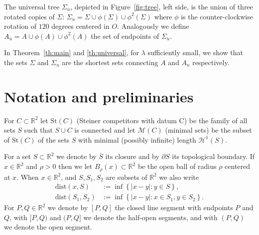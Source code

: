 \documentclass{amsart}
\newcommand{\RR}{\mathbb R}
\newcommand{\CC}{\mathbb C}
\newcommand{\NN}{\mathbb N}
\renewcommand{\H}{\mathcal H}
\newcommand{\abs}[1]{\left\vert #1 \right\vert}
\newcommand{\ENCLOSE}[1]{\left\{#1\right\}}
\newcommand{\St}{\mathrm{St}}
\newcommand{\M}{\mathcal{M}}
\renewcommand{\H}{\mathcal{H}}
\newcommand{\dist}{\mathrm{dist}}
\theoremstyle{definition}
\theoremstyle{remark}
\begin{document}
The universal tree $\Sigma_u$, depicted in Figure~\ref{fig:tree}, left side,
is the union of three rotated copies of $\Sigma$: $\Sigma_u = \Sigma \cup \phi(\Sigma) \cup \phi^2(\Sigma)$
where $\phi$ is the counter-clockwise rotation of $120$ degrees centered in $O$.
Analogously we define $A_u = A \cup \phi(A) \cup \phi^2(A)$ the set of endpoints of $\Sigma_u$.

In Theorem~\ref{th:main} and \ref{th:universal},
for $\lambda$ sufficiently small,
we show that the sets 
$\Sigma$ and $\Sigma_u$ are
the shortest sets connecting $A$ and $A_u$ respectively.

% 
\section{Notation and preliminaries}

For $C\subset \RR^2$ let $\St(C)$ (Steiner competitors with datum C) be the family of all sets $S$ such that 
$S\cup C$ is connected and 
let $\M(C)$ (minimal sets) be the subset of $\St(C)$ of the sets $S$ 
with minimal (possibly infinite) length $\H^1(S)$.

For a set $S\subset \RR^2$ we denote by $\bar S$ 
its closure and by $\partial S$ its topological boundary.
If $x\in \RR^2$ and $\rho>0$ then we let $B_\rho(x)\subset \RR^2$ 
be the open ball of radius 
$\rho$ centered at $x$.
When $x\in \RR^2$, and $S,S_1,S_2$ are subsets of $\RR^2$
we also write
\begin{align*}
  \dist(x,S)
    &:=\inf\ENCLOSE{\abs{x-y}:y\in S},\\
  \dist(S_1,S_2) 
    &:= \inf\ENCLOSE{\abs{x-y}\colon x\in S_1, y\in S_2}.
\end{align*}
For $P,Q\in \RR^2$ we denote by $[P,Q]$ the closed line 
segment with endpoints $P$ and $Q$, with $[P,Q)$ and $(P,Q]$ 
we denote the half-open segments, and with $(P,Q)$ we denote 
the open segment.
\end{document}
